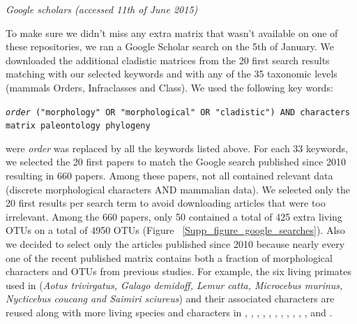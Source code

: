 \documentclass[12pt,letterpaper]{article}
\renewcommand{\subsection}[1]{%
\bigskip
\begin{center}
\begin{large}
\normalfont\itshape #1
\end{large}
\end{center}}
\begin{document}
\subsection{Google scholars (accessed 11th of June 2015)}
To make sure we didn't miss any extra matrix that wasn't available on one of these repositories, we ran a Google Scholar search on the 5th of January. 
We downloaded the additional cladistic matrices from the 20 first search results matching with our selected keywords and with any of the 35 taxonomic levels (mammals Orders, Infraclasses and Class).
We used the following key words:

\texttt{\textit{order} ("morphology" OR "morphological" OR "cladistic") AND characters matrix paleontology phylogeny}

were \textit{order} was replaced by all the keywords listed above. For each 33 keywords, we selected the 20 first papers to match the Google search published since 2010 resulting in 660 papers.
Among these papers, not all contained relevant data (discrete morphological characters AND mammalian data).
We selected only the 20 first results per search term to avoid downloading articles that were too irrelevant.
Among the 660 papers, only 50 contained a total of 425 extra living OTUs on a total of 4950 OTUs (Figure ~\ref{Supp_figure_google_searches}).
Also we decided to select only the articles published since 2010 because nearly every one of the recent published matrix contains both a fraction of morphological characters and OTUs from previous studies.
For example, the six living primates used in \cite{ross1998phylogenetic} (\textit{Aotus trivirgatus, Galago demidoff, Lemur catta, Microcebus murinus, Nycticebus coucang and Saimiri sciureus}) and their associated characters are reused along with more living species and characters in \cite{seiffert2003fossil}, \cite{marivaux2005anthropoid}, \cite{seiffert2005basal}, \cite{bloch2007new}, \cite{bloch2007new}, \cite{kay2008anatomy}, \cite{silcox2008biogeographic}, \cite{seiffert2009convergent}, \cite{tabuce2009anthropoid}, \cite{boyer2010astragalar}, \cite{seiffert2010fossil}, \cite{marivaux2013djebelemur} and \cite{ni2013oldest}.
\end{document}
